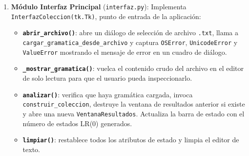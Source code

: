 \begin{enumerate}
  \item \textbf{Módulo Interfaz Principal} (\texttt{interfaz.py}):
    Implementa \texttt{InterfazColeccion(tk.Tk)}, punto de entrada de la aplicación:
    \begin{itemize}
      \item \textbf{\texttt{abrir\_archivo()}}: abre un diálogo de selección de archivo
            \texttt{.txt}, llama a \texttt{cargar\_gramatica\_desde\_archivo} y captura
            \texttt{OSError}, \texttt{UnicodeError} y \texttt{ValueError} mostrando
            el mensaje de error en un cuadro de diálogo.
      \item \textbf{\texttt{\_mostrar\_gramatica()}}: vuelca el contenido crudo del
            archivo en el editor de solo lectura para que el usuario pueda inspeccionarlo.
      \item \textbf{\texttt{analizar()}}: verifica que haya gramática cargada, invoca
            \texttt{construir\_coleccion}, destruye la ventana de resultados anterior si
            existe y abre una nueva \texttt{VentanaResultados}. Actualiza la barra de
            estado con el número de estados LR(0) generados.
      \item \textbf{\texttt{limpiar()}}: restablece todos los atributos de estado y
            limpia el editor de texto.
    \end{itemize}
\end{enumerate}
